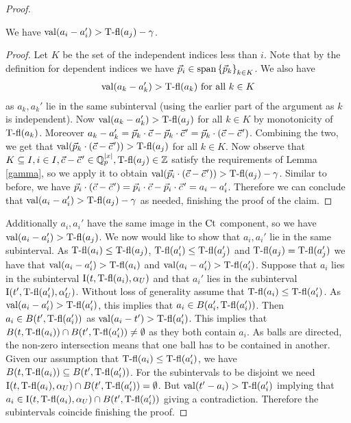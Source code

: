 \begin{proof}
  \begin{Claim}
    We have $\operatorname{val}(a_i - a_i') > \operatorname{T-fl}(a_j) - \gamma$.
  \end{Claim}
  \begin{proof}
    Let $K$ be the set of the independent indices less than $i$.
    Note that by the definition for dependent indices we have $\vec p_i \in \operatorname{span} \left\{\vec p_k\right\}_{k \in K}$.
    We also have 
    \begin{align*}
      \operatorname{val}(a_k - a_k') > \operatorname{T-fl}(a_k) \text { for all } k \in K
    \end{align*}
    as $a_k, a_k'$ lie in the same subinterval (using the earlier part of the argument as $k$ is independent).
    Now $\operatorname{val}(a_k - a_k') > \operatorname{T-fl}(a_j)$  for all $k \in K$ by monotonicity of $\operatorname{T-fl}(a_k)$.
    Moreover $a_k - a_k' = \vec p_k \cdot \vec c - \vec p_k \cdot \pvec c' = \vec p_k \cdot (\vec c - \pvec {c}')$.
    Combining the two, we get that $\val(\vec p_k \cdot (\vec c - \pvec {c}')) > \tfl(a_j)$ for all $k \in K$.
    Now observe that $K \subseteq I, i \in I, \vec c - \pvec {c}' \in \Q_p^{|x|}, \tfl(a_j) \in \Z$
    satisfy the requirements of Lemma \ref {gamma}, so we apply it to obtain
    $\val(\vec p_i \cdot (\vec c - \pvec {c}')) > \tfl(a_j) - \gamma$.
    Similar to before, we have $\vec p_i \cdot (\vec c - \pvec {c}') = \vec p_i \cdot \vec c - \vec p_i \cdot \pvec {c}' = a_i - a_i'$.
    Therefore we can conclude that $\operatorname{val}(a_i - a_i') > \operatorname{T-fl}(a_j) - \gamma$
    as needed, finishing the proof of the claim.
  \end{proof}	
  Additionally $a_i, a_i'$ have the same image in the $\operatorname{Ct}$ component, so we have $\operatorname{val}(a_i - a_i') > \operatorname{T-fl}(a_j)$.
  We now would like to show that $a_i, a_i'$ lie in the same subinterval.
  As $\operatorname{T-fl}(a_i) \leq \operatorname{T-fl}(a_j)$, $\operatorname{T-fl}(a_i') \leq \operatorname{T-fl}(a_j')$ and $\operatorname{T-fl}(a_j) = \operatorname{T-fl}(a_j')$ we have that
  $\operatorname{val}(a_i - a_i') > \operatorname{T-fl}(a_i)$ and $\operatorname{val}(a_i - a_i') > \operatorname{T-fl}(a_i')$.
  Suppose that $a_i$ lies in the subinterval $\operatorname{I}(t, \operatorname{T-fl}(a_i), \alpha_U)$
  and that $a_i'$ lies in the subinterval $\operatorname{I}(t', \operatorname{T-fl}(a_i'), \alpha_U')$.
  Without loss of generality assume that $\operatorname{T-fl}(a_i) \leq \operatorname{T-fl}(a_i')$.
  As $\operatorname{val}(a_i - a_i') > \operatorname{T-fl}(a_i')$, this implies that $a_i \in B(a_i', \operatorname{T-fl}(a_i'))$.
  Then $a_i \in B(t', \operatorname{T-fl}(a_i'))$ as $\operatorname{val}(a_i - t') > \operatorname{T-fl}(a_i')$.
  This implies that $B(t, \operatorname{T-fl}(a_i)) \cap B(t', \operatorname{T-fl}(a_i')) \neq \emptyset$ as they both contain $a_i$.
  As balls are directed, the non-zero intersection means that one ball has to be contained in another.
  Given our assumption that $\operatorname{T-fl}(a_i) \leq \operatorname{T-fl}(a_i')$, we have $B(t, \operatorname{T-fl}(a_i)) \subseteq B(t', \operatorname{T-fl}(a_i'))$.
  For the subintervals to be disjoint we need 
  $\operatorname{I}(t, \operatorname{T-fl}(a_i), \alpha_U) \cap B(t', \operatorname{T-fl}(a_i')) = \emptyset$.
  But $\operatorname{val}(t' - a_i) > \operatorname{T-fl}(a_i')$ implying that $a_i \in \operatorname{I}(t, \operatorname{T-fl}(a_i), \alpha_U) \cap B(t', \operatorname{T-fl}(a_i'))$ giving a contradiction.
  Therefore the subintervals coincide finishing the proof.
\end{proof}

